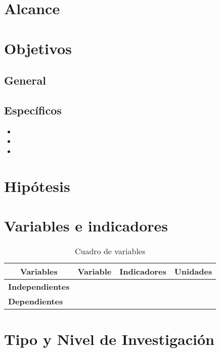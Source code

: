 

\section{Alcance}


\section{Objetivos}

\subsection{General}


\subsection{Específicos}

\begin{itemize}
 \item 
\item 
\item 

\end{itemize}

\section{Hipótesis}



\section{Variables e indicadores}

 \begin{table}[htbp]
 \caption{Cuadro de variables}\label{t1}
\begin{tabular}{lllccc}
\hline
\multicolumn{3}{c}{\textbf{Variables}}                       & \textbf{Variable}      & \textbf{Indicadores}                 & \textbf{Unidades} \\ \hline
\multicolumn{3}{c}{\multirow{2}{*}{\textbf{Independientes}}} &   &   & \\ \cline{4-6} 
\multicolumn{3}{c}{}                                         &   &   & \\ \hline
\multicolumn{3}{l}{\multirow{4}{*}{\textbf{Dependientes}}}   &   &   & \\ \cline{4-6} 
\multicolumn{3}{l}{}                                         &   &   & \\ \cline{4-6} 
\multicolumn{3}{l}{}                                         &   &   & \\ \cline{4-6} 
\multicolumn{3}{l}{}                                         &   &   & \\ \hline
\end{tabular}
\end{table}

\section{Tipo y Nivel de Investigación}



